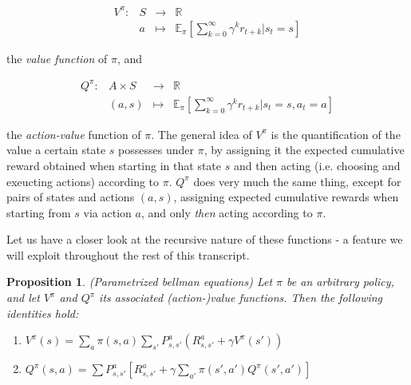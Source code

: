 \documentclass[11pt]{article} %
\newtheorem{prop}{Proposition}
\begin{document}
\[
	\begin{array}{llll}
		V^{\pi} :	& S 	& \to 	& \mathbb{R} \\
				& a	& \mapsto	& \mathbb{E}_{\pi}[\sum_{k=0}^{\infty} \gamma^k r_{t+k} | s_t = s]
	\end{array}
\]

the \textit{value function} of $\pi$, and 

\[
	\begin{array}{llll}
		Q^{\pi} : 	& A \times S 	& \to 	& \mathbb{R} \\
				& (a,s)		& \mapsto	& \mathbb{E}_{\pi}[\sum_{k=0}^{\infty} \gamma^k r_{t+k} | s_t = s, a_t = a]
	\end{array}
\]

the \textit{action-value} function of $\pi$. The general idea of $V^{\pi}$ is the quantification of the value a certain state $s$ possesses under $\pi$, by assigning it the expected cumulative reward obtained when starting in that state $s$ and then acting (i.e. choosing and exeucting actions) according to $\pi$. $Q^{\pi}$ does very much the same thing, except for pairs of states and actions $(a,s)$, assigning expected cumulative rewards when starting from $s$ via action $a$, and only \textit{then} acting according to $\pi$.

\newpage

Let us have a closer look at the recursive nature of these functions - a feature we will exploit throughout the rest of this transcript.

\begin{prop}{(Parametrized bellman equations)}
	Let $\pi$ be an arbitrary policy, and let $V^{\pi}$ and $Q^{\pi}$ its associated (action-)value functions. Then the following identities hold:
	\begin{enumerate}
		\item $V^{\pi}(s) = \sum_{a} \pi(s,a) \sum_{s'} P_{s,s'}^a ( R_{s,s'}^a + \gamma V^{\pi}(s') ) $
		\item $Q^{\pi}(s,a) = \sum P_{s,s'}^a [ R_{s,s'}^a + \gamma \sum_{a'} \pi(s',a') Q^{\pi}(s',a') ] $
	\end{enumerate}
\end{prop}
\end{document}

